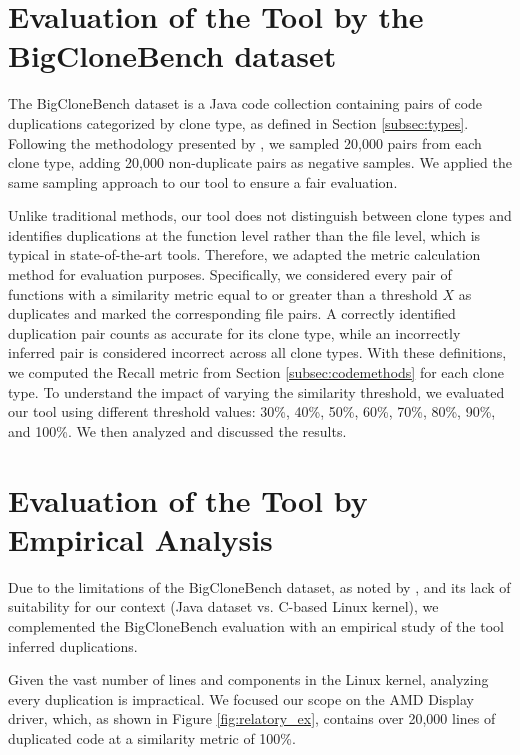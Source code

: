 \section{Evaluation of the Tool by the BigCloneBench dataset}

\label{sec:metbig}

The BigCloneBench dataset \citep{bigclonebench} is a Java code collection containing pairs of code duplications categorized by clone type, as defined in Section \ref{subsec:types}.
%
Following the methodology presented by \citep{tailor}, we sampled 20,000 pairs from each clone type, adding 20,000 non-duplicate pairs as negative samples. We applied the same sampling approach to our tool to ensure a fair evaluation.

Unlike traditional methods, our tool does not distinguish between clone types and identifies duplications at the function level rather than the file level, which is typical in state-of-the-art tools. Therefore, we adapted the metric calculation method for evaluation purposes. Specifically, we considered every pair of functions with a similarity metric equal to or greater than a threshold \(X\) as duplicates and marked the corresponding file pairs. A correctly identified duplication pair counts as accurate for its clone type, while an incorrectly inferred pair is considered incorrect across all clone types. With these definitions, we computed the Recall metric from Section \ref{subsec:codemethods} for each clone type.
%
To understand the impact of varying the similarity threshold, we evaluated our tool using different threshold values: 30\%, 40\%, 50\%, 60\%, 70\%, 80\%, 90\%, and 100\%. We then analyzed and discussed the results.

\section{Evaluation of the Tool by Empirical Analysis}

\label{sec:metemp}


Due to the limitations of the BigCloneBench dataset, as noted by \cite{bigfail}, and its lack of suitability 
for our context (Java dataset vs. C-based Linux kernel), we complemented the BigCloneBench evaluation with 
an empirical study of the tool inferred duplications.

Given the vast number of lines and components in the Linux kernel, analyzing every duplication is impractical. We focused our scope on the AMD Display driver, which, as shown in Figure \ref{fig:relatory_ex}, contains over 20,000 lines of duplicated code at a similarity metric of 100\%.

